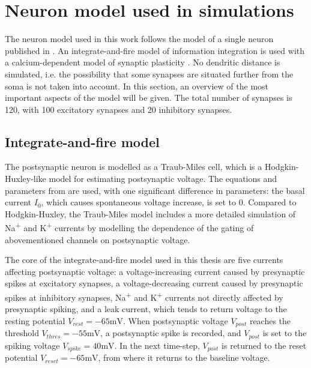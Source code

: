 \documentclass[a4paper,12pt]{report}
\theoremstyle{definition}
\begin{document}
\section{Neuron model used in simulations}

The neuron model used in this work follows the model of a single neuron published in \cite{yeung2004synaptic}. An integrate-and-fire model of information integration is used with a calcium-dependent model of synaptic plasticity \cite{shouval2002unified}. No dendritic distance is simulated, i.e. the possibility that some synapses are situated further from the soma is not taken into account. In this section, an overview of the most important aspects of the model will be given. The total number of synapses is 120, with 100 excitatory synapses and 20 inhibitory synapses.










\subsection{Integrate-and-fire model}

The postsynaptic neuron is modelled as a Traub-Miles cell, which is a Hodgkin-Huxley-like model for estimating postsynaptic voltage. The equations and parameters from \cite{ermentrout1998fine} are used, with one significant difference in parameters: the basal current $I_0$, which causes spontaneous voltage increase, is set to $0$. Compared to Hodgkin-Huxley, the Traub-Miles model includes a more detailed simulation of Na\textsuperscript{+} and K\textsuperscript{+} currents by modelling the dependence of the gating of abovementioned channels on postsynaptic voltage.

The core of the integrate-and-fire model used in this thesis are five currents affecting postsynaptic voltage: a voltage-increasing current caused by presynaptic spikes at excitatory synapses, a voltage-decreasing current caused by presynaptic spikes at inhibitory synapses, Na\textsuperscript{+} and K\textsuperscript{+} currents not directly affected by presynaptic spiking, and a leak current, which tends to return voltage to the resting potential $V_{rest}=-65\mathrm{mV}$. When postsynaptic voltage $V_{post}$ reaches the threshold $V_{thres}=-55\mathrm{mV}$, a postsynaptic spike is recorded, and $V_{post}$ is set to the spiking voltage $V_{spike}=40\mathrm{mV}$. In the next time-step, $V_{post}$ is returned to the reset potential $V_{reset}=-65\mathrm{mV}$, from where it returns to the baseline voltage.
\end{document}
